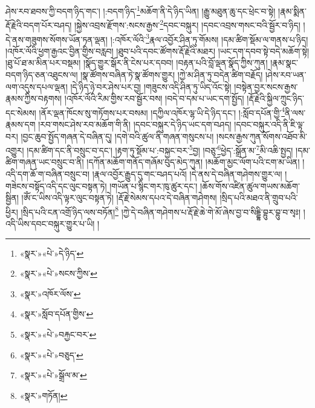 ཤེས་རབ་ཐབས་ཀྱི་བདག་ཉིད་གང་། །:བདག་ཉིད་\footnote{«སྣར་»«པེ་»དེ་ཉིད་}མཆོག་ནི་དེ་ཉིད་ཡིན། །རྒྱུ་མཐུན་ཆུ་དང་ཕྲེང་བ་སྟེ། །རྣམ་སྨིན་རྡོ་རྗེའི་བདག་པོར་བཤད། །སྐྱེས་འབྲས་རྫོགས་:སངས་རྒྱས་\footnote{«སྣར་»«པེ་»སངས་ཀྱིས་}དབང་བསྐུར། །དབང་འབྲས་གསང་བའི་སྦྱོར་བ་ཉིད། །དེ་ནས་གཟུགས་སོགས་ཡོན་ཏན་ལྡན། །:འཁོར་ལོའི་\footnote{«སྣར་»འཁོར་ལོས་}རྣལ་འབྱོར་ཤིན་ཏུ་གོམས། །དམ་ཚིག་སྡོམ་ལ་གནས་པ་ཉིད། །འཁོར་ལོའི་ཕྱག་རྒྱའང་བྱིན་གྱིས་བརླབ། །ཐུབ་པའི་དབང་ཚོགས་རྡོ་རྗེའི་མཐར། །ཡང་དག་དབབ་སྟེ་བདེ་མཆོག་སྟེ། །ཐུ་པོ་ཐ་མ་མིན་པར་བསྡམ། །སྣོད་གྱུར་སྒོར་ནི་ངེས་པར་དབབ། །བརྟན་པའི་བློ་ལྡན་སྣོད་ཀྱིས་ཀུན། །རྣམ་སྣང་བདག་ཉིད་ཅན་འཐུངས་ལ། །སྣ་ཚོགས་བཞིན་ཏེ་སྣ་ཚོགས་གྱུར། །ཀྱེ་མ་ཤིན་ཏུ་བདེན་ཚིག་བརྗོད། །ཤེས་རབ་ཡན་ལག་འདུས་དཔལ་ལྡན། །དེ་ཉིད་ཉེ་བར་ཤེས་པར་བྱ། །གཟུངས་འདི་ཤིན་ཏུ་ཡིད་འོང་སྟེ། །བསྟེན་བྱར་སངས་རྒྱས་རྣམས་ཀྱིས་བརྟགས། །འཁོར་ལོའི་རིམ་གྱིས་རབ་སྦྱོར་བས། །བདེ་བ་དམ་པ་ཡང་དག་སྤྱོད། །རྡོ་རྗེའི་སྐྱིལ་ཀྲུང་ཉིད་དང་སེམས། །ནོར་ལྡན་ཁོངས་སུ་གཏོགས་པར་བསམ། །དཀྱིལ་འཁོར་ལྷ་ཡི་དེ་ཉིད་དང་། །:སློབ་དཔོན་གྱི་\footnote{«སྣར་»སློབ་དཔོན་གྱིས་}ནི་ལས་རྣམས་དག །རབ་གསང་ཤེས་རབ་མཆོག་གི་ནི། །དབང་བསྐུར་དེ་ཉིད་ཡང་དག་བཤད། །དབང་བསྐུར་འདི་ནི་ཇི་ལྟ་བར། །བྱང་ཆུབ་སྤྱོད་གཞན་དེ་བཞིན་དུ། །དགེ་བའི་ཚུལ་ནི་གཞན་གསུངས་པ། །སངས་རྒྱས་ཀུན་སོགས་འཐོབ་མི་འགྱུར། །དམ་ཚིག་དང་ནི་བསྲུང་བ་དང་། །རྟག་ཏུ་སྡོམ་པ་:བསྐྱང་བར་\footnote{«སྣར་»«པེ་»བརྐྱང་བར་}བྱ། །བཅུ་\footnote{«སྣར་»«པེ་»བཅུད་}ཕྱེད་:སྒྲོན་མ་\footnote{«སྣར་»«པེ་»སྒྲོལ་མ་}མི་འཆི་སྤྱད། །དམ་ཚིག་གཞན་ཡང་བསྲུང་བ་ནི། །དཀོན་མཆོག་གནོད་གཞོམ་བུད་མེད་ཀུན། །མཆོག་མྱང་ལོག་པའི་ངག་མ་ཡིན། །འདི་དག་ཆོ་ག་བཞིན་བསྲུང་བ། །རྣལ་འབྱོར་རྒྱུད་དུ་གང་བཤད་པའོ། །དེ་ནས་དེ་བཞིན་གཤེགས་གྱུར་ལ། །གཟེངས་བསྟོད་འདི་དང་ལུང་བསྟན་ཏེ། །གཡོན་པ་སྙིང་གར་ཁུ་ཚུར་དང་། །ཆོས་གོས་འཛིན་ཚུལ་གཡས་མཆོག་སྦྱིན། །ཨོཾ་ང་ཡིས་འདི་ལྟར་ལུང་བསྟན་ཏེ། །རྡོ་རྗེ་སེམས་དཔའ་དེ་བཞིན་གཤེགས། །སྲིད་པའི་མཐའ་ནི་གྲུབ་པའི་ཕྱིར། །སྲིད་པའི་ངན་འགྲོ་ཉིད་ལས་བཏོན།\footnote{«སྣར་»གཏོན།} །ཀྱེ་དེ་བཞིན་གཤེགས་པ་རྡོ་རྗེ་ཆེ་གེ་མོ་ཞེས་བྱ་བ་སིདྡྷི་བྷུར་བྷུ་བ་སྭཿ། །འདི་ཡིས་དབང་བསྐུར་གྱུར་པ་ཡི། །
